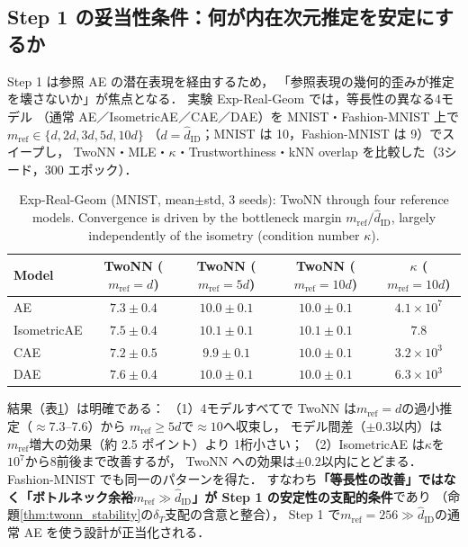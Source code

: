 \documentclass[11pt,a4paper]{jsarticle}
\newcommand{\hatdID}{\hat{d}_{\mathrm{ID}}}
\newcommand{\kap}{\kappa}
\begin{document}
\subsection{Step 1 の妥当性条件：何が内在次元推定を安定にするか}\label{sec:exp_real_geom}

Step 1 は参照 AE の潜在表現を経由するため，
「参照表現の幾何的歪みが推定を壊さないか」が焦点となる．
実験 Exp-Real-Geom では，等長性の異なる4モデル
（通常 AE／IsometricAE\cite{kato2020rdae}／CAE\cite{rifai2011cae}／DAE\cite{alain2014dae}）を
MNIST・Fashion-MNIST 上で$m_{\mathrm{ref}} \in \{d, 2d, 3d, 5d, 10d\}$
（$d = \hatdID$；MNIST は 10，Fashion-MNIST は 9）でスイープし，
TwoNN・MLE・$\kap$・Trustworthiness・kNN overlap を比較した（3シード，300 エポック）．

\begin{table}[H]
\centering
\caption{Exp-Real-Geom (MNIST, mean$\pm$std, 3 seeds): TwoNN through four
reference models. Convergence is driven by the bottleneck margin
$m_{\mathrm{ref}} / \hatdID$, largely independently of the isometry
(condition number $\kap$).}
\label{tab:real_geom}
\small
\begin{tabular}{lcccc}
\toprule
Model & TwoNN ($m_{\mathrm{ref}} = d$) & TwoNN ($m_{\mathrm{ref}} = 5d$) & TwoNN ($m_{\mathrm{ref}} = 10d$) & $\kap$ ($m_{\mathrm{ref}} = 10d$) \\
\midrule
AE          & $7.3 \pm 0.4$ & $10.0 \pm 0.1$ & $10.0 \pm 0.1$ & $4.1 \times 10^{7}$ \\
IsometricAE & $7.5 \pm 0.4$ & $10.1 \pm 0.1$ & $10.1 \pm 0.1$ & $7.8$ \\
CAE         & $7.2 \pm 0.5$ & $9.9 \pm 0.1$  & $10.0 \pm 0.1$ & $3.2 \times 10^{3}$ \\
DAE         & $7.6 \pm 0.4$ & $10.0 \pm 0.1$ & $10.0 \pm 0.1$ & $6.3 \times 10^{3}$ \\
\bottomrule
\end{tabular}
\end{table}

結果（表\ref{tab:real_geom}）は明確である：
（1）4モデルすべてで TwoNN は$m_{\mathrm{ref}} = d$の過小推定（$\approx 7.3$--7.6）から
$m_{\mathrm{ref}} \geq 5d$で$\approx 10$へ収束し，
モデル間差（$\pm 0.3$以内）は$m_{\mathrm{ref}}$増大の効果（約 2.5 ポイント）より
1桁小さい；
（2）IsometricAE は$\kap$を$10^{7}$から$8$前後まで改善するが，
TwoNN への効果は$\pm 0.2$以内にとどまる．
Fashion-MNIST でも同一のパターンを得た．
すなわち\textbf{「等長性の改善」ではなく「ボトルネック余裕$m_{\mathrm{ref}} \gg \hatdID$」が
Step 1 の安定性の支配的条件}であり
（命題\ref{thm:twonn_stability}の$\delta_T$支配の含意と整合），
Step 1 で$m_{\mathrm{ref}} = 256 \gg \hatdID$の通常 AE を使う設計が正当化される．
\end{document}
